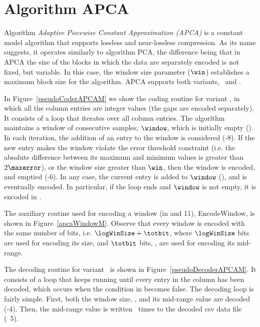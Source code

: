 
\clearpage

\section{Algorithm APCA}
\label{algo:apca}


Algorithm \textit{Adaptive Piecewise Constant Approximation (APCA)} \cite{coder:apca} is a constant model algorithm that supports lossless and near-lossless compression. As its name suggests, it operates similarly to algorithm PCA, the difference being that in APCA the size of the blocks in which the data are separately encoded is not fixed, but variable. In this case, the window size parameter ($\win$) establishes a maximum block size for the algorithm. APCA supports both variants, \maskalgo\ and \NOmaskalgo.


In Figure~\ref{pseudoCoderAPCAM} we show the coding routine for variant \maskalgo, in which all the column entries are integer values (the gaps are encoded separately). It consists of a loop that iterates over all column entries. The algorithm maintains a window of consecutive samples, $\window$, which is initially empty (). In each iteration, the addition of an entry to the window is considered (-8). If the new entry makes the window violate the error threshold constraint (i.e. the absolute difference between its maximum and minimum values is greater than $2\maxerror$), or the window size greater than $\win$, then the window is encoded, and emptied (-6). In any case, the current entry is added to $\window$ (), and is eventually encoded. In particular, if the loop ends and $\window$ is not empty, it is encoded in . 





\vspace{+2pt}
The auxiliary routine used for encoding a window (in  and 11), EncodeWindow, is shown in Figure~\ref{apcaWindowM}. Observe that every window is encoded with the same number of bits, i.e. $\logWinSize +\totbit$, where $\logWinSize$ bits are used for encoding its size, and $\totbit$ bits, \wheretotbit, are used for encoding its mid-range.
\vspace{+3pt}





\clearpage


The decoding routine for variant \maskalgo\ is shown in Figure~\ref{pseudoDecoderAPCAM}. It consists of a loop that keeps running until every entry in the column has been decoded, which occurs when the condition in  becomes false. The decoding loop is fairly simple. First, both the window size, \sizee, and its mid-range value are decoded (-4). Then, the mid-range value is written \sizee\ times to the decoded csv data file (\Line~5).


